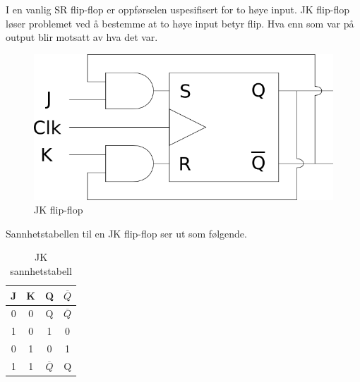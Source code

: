 I en vanlig SR flip-flop er oppførselen uspesifisert for to høye input.
JK flip-flop løser problemet ved å bestemme at to høye input betyr flip.
Hva enn som var på output blir motsatt av hva det var.
\begin{figure}[H]
  \caption{JK flip-flop}
  \centering
    \includegraphics[width=\textwidth]{./img/jk}
\end{figure}
Sannhetstabellen til en JK flip-flop ser ut som følgende.
\begin{table}[H]
  \caption{JK sannhetstabell}
  \centering
  \begin{tabular}{c|c|c|c}
    J & K & Q & $\overline{Q}$ \\ \hline
    0 & 0 & Q & $\overline{Q}$ \\
    1 & 0 & 1 & 0 \\
    0 & 1 & 0 & 1 \\
    1 & 1 & $\overline{Q}$ & Q
  \end{tabular}
\end{table}
